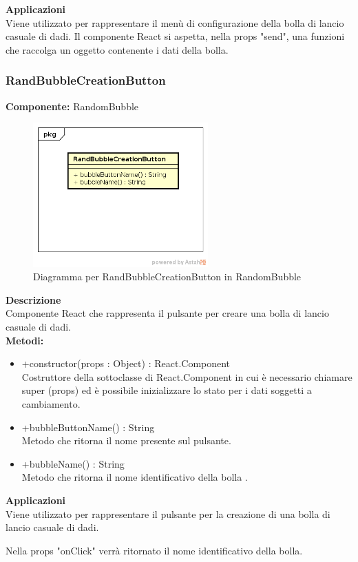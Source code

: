 \textbf{Applicazioni}\\
Viene utilizzato per rappresentare il menù di configurazione della bolla di lancio casuale di dadi. Il componente React si aspetta, nella props "send", una funzioni che raccolga un oggetto contenente i dati della bolla. 


\clearpage

\subsubsection{RandBubbleCreationButton}
\textbf{Componente:}  RandomBubble\\
   \FloatBarrier
   \begin{figure}[ht]
   \centering
   \includegraphics[width=0.6\textwidth]{img/single-diceBubbleCreationButton}
   \caption{{Diagramma per RandBubbleCreationButton in RandomBubble}}
\end{figure}
\FloatBarrier
\textbf{Descrizione}\\
Componente React che rappresenta il pulsante per creare una bolla di lancio casuale di dadi.
\\
\textbf{Metodi:} 
\begin{itemize}
\item +constructor(props : Object) : React.Component 
\\
Costruttore della sottoclasse di React.Component in cui è necessario chiamare super (props) ed è possibile inizializzare lo stato per i dati soggetti a cambiamento.

\item +bubbleButtonName() : String 
\\
Metodo che ritorna il nome presente sul pulsante.

\item +bubbleName() : String 
\\
Metodo che ritorna il nome identificativo della bolla .

\end{itemize} 


\textbf{Applicazioni}\\
Viene utilizzato per rappresentare il pulsante per la creazione di una bolla di lancio casuale di dadi.

Nella props "onClick" verrà ritornato il nome identificativo della bolla. 


